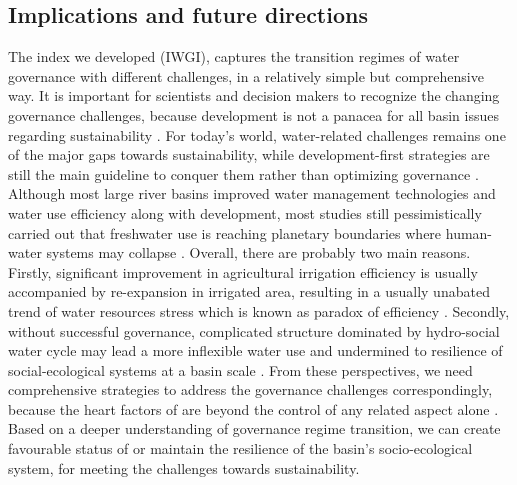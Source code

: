\documentclass[9pt, twocolumn, twoside, lineno]{pnas-new}
\begin{document}
\subsection*{Implications and future directions}
\label{Outlook}

The index we developed (IWGI), captures the transition regimes of water governance with different challenges, in a relatively simple but comprehensive way.
It is important for scientists and decision makers to recognize the changing governance challenges, because development is not a panacea for all basin issues regarding sustainability 
\cite{cummingLinkingEconomicGrowth2018,reyers2018}.
For today's world, water-related challenges remains one of the major gaps towards sustainability, while development-first strategies are still the main guideline to conquer them rather than optimizing governance 
\cite{xu2020,liu2017,greveGlobalAssessmentWater2018}. 
Although most large river basins improved water management technologies and water use efficiency along with development, most studies still pessimistically carried out that freshwater use is reaching planetary boundaries where human-water systems may collapse 
\cite{li2020a,degraaf2019,huggins2020}.
Overall, there are probably two main reasons.
Firstly, significant improvement in agricultural irrigation efficiency is usually accompanied by re-expansion in irrigated area, resulting in a usually unabated trend of water resources stress which is known as paradox of efficiency 
\cite{grafton2018}. 
Secondly, without successful governance, complicated structure dominated by hydro-social water cycle may lead a more inflexible water use and undermined to resilience of social-ecological systems at a basin scale
\cite{qin2019,levia2020,grill2019}.
From these perspectives, we need comprehensive strategies to address the governance challenges correspondingly, because the heart factors of are beyond the control of any related aspect alone
\cite{steffen2020,muneepeerakul2020,bodinCollaborativeEnvironmentalGovernance2017,biermann2012}. 
Based on a deeper understanding of governance regime transition, we can create favourable status of or maintain the resilience of the basin's socio-ecological system, for meeting the challenges towards sustainability.
\end{document}
